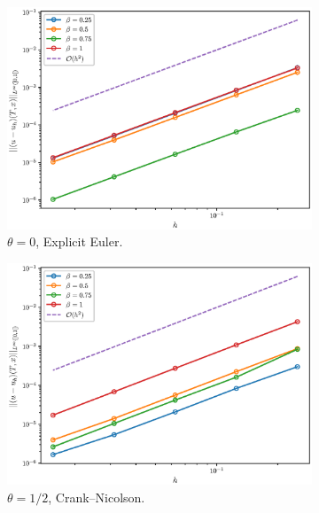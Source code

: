 \begin{figure}[h]
\centering
\begin{subfigure}{0.5\textwidth}
  \centering
  \includegraphics[width=1\linewidth]{figures/theta0/linf.eps}
  \caption{$\theta=0$, Explicit Euler.}
  \label{fig:sub1}
\end{subfigure}%
\begin{subfigure}{0.5\textwidth}
  \centering
  \includegraphics[width=1\linewidth]{figures/theta1o2/linf.eps}
  \caption{$\theta=1/2$, Crank--Nicolson.}
  \label{fig:sub2}
\end{subfigure} \\
\begin{subfigure}{0.5\textwidth}
  \centering

\end{subfigure}
\end{figure}

